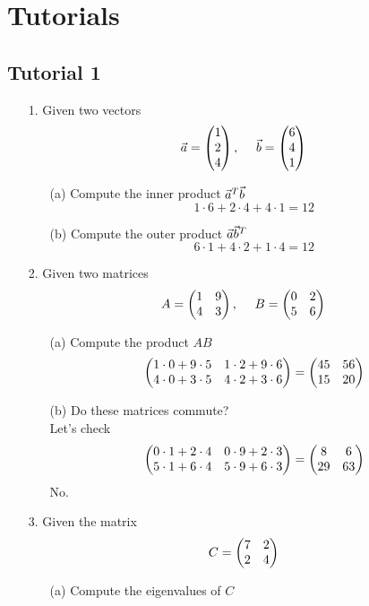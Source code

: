 \documentclass[english, 11pt]{article}
\begin{document}
   \section{Tutorials}

     \subsection{Tutorial 1}

     \begin{itemize}
       \item[1.] Given two vectors
       \[ \vec{a} = \left(\begin{matrix}1 \\ 2 \\ 4\end{matrix}\right), \ \ \ \  \vec{b} = \left(\begin{matrix}6 \\ 4 \\ 1\end{matrix}\right) \]
       \begin{itemize}
         \item[(a)] Compute the inner product $\vec{a}^T\vec{b}$ \\
           \[ 1\cdot6 + 2\cdot4 + 4\cdot 1 = 12 \]
         \item[(b)] Compute the outer product $\vec{a}\vec{b}^T$
           \[ 6 \cdot 1 + 4\cdot2 + 1\cdot4 = 12 \]
       \end{itemize}
       \item[2.] Given two matrices
       \[ A = \left(\begin{matrix}1 & 9 \\ 4 & 3\end{matrix}\right), \ \ \ \ B = \left(\begin{matrix}0 & 2 \\ 5 & 6\end{matrix}\right) \]
       \begin{itemize}
         \item[(a)] Compute the product $AB$
           \[ \left(\begin{matrix}1\cdot0 + 9\cdot5 & 1 \cdot2 + 9\cdot 6 \\ 4 \cdot 0 + 3 \cdot 5 & 4 \cdot 2 + 3 \cdot 6\end{matrix}\right) = \left(\begin{matrix}45 & 56 \\ 15 & 20\end{matrix}\right)\]
         \item[(b)] Do these matrices commute? \\
           Let's check
           \[ \left(\begin{matrix} 0 \cdot 1 + 2 \cdot 4 & 0 \cdot 9 + 2 \cdot 3 \\ 5\cdot1 + 6 \cdot 4 &  5 \cdot 9 + 6\cdot 3 \end{matrix}\right) = \left(\begin{matrix}8 & 6 \\ 29 & 63\end{matrix}\right) \]
           No.
       \end{itemize}
       \item[3.] Given the matrix
       \[ C = \left(\begin{matrix}7 & 2 \\ 2 & 4\end{matrix}\right) \]
       \begin{itemize}
         \item[(a)] Compute the eigenvalues of $C$

\end{itemize}
\end{itemize}
\end{document}
